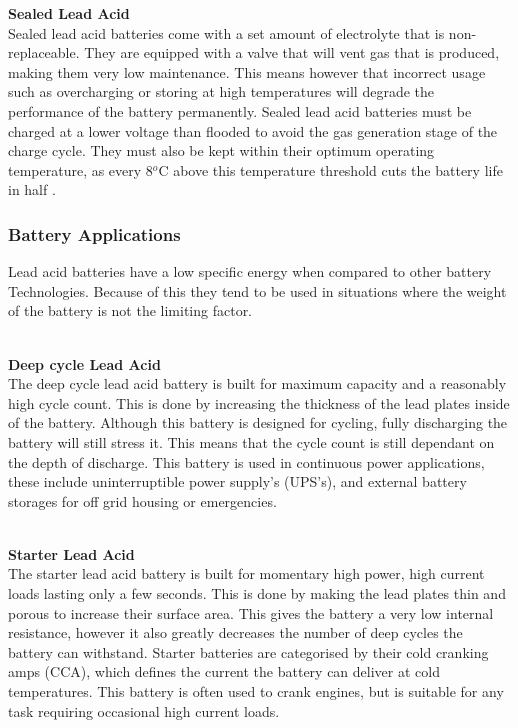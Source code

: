 \documentclass[a4paper,11pt, twocolumn]{article}
\begin{document}
\textbf{Sealed Lead Acid}\\
Sealed lead acid batteries come with a set amount of electrolyte that is non-replaceable. They are equipped with a valve that will vent gas that is produced, making them very low maintenance. This means however that incorrect usage such as overcharging or storing at high temperatures will degrade the performance of the battery permanently. Sealed lead acid batteries must be charged at a lower voltage than flooded to avoid the gas generation stage of the charge cycle. They must also be kept within their optimum operating temperature, as every 8$^o$C above this temperature threshold cuts the battery life in half \cite{lead_acid}.

\subsubsection{Battery Applications}

Lead acid batteries have a low specific energy when compared to other battery Technologies. Because of this they tend to be used in situations where the weight of the battery is not the limiting factor.

\textbf{\\Deep cycle Lead Acid}\\
The deep cycle lead acid battery is built for maximum capacity and a reasonably high cycle count. This is done by increasing the thickness of the lead plates inside of the battery. Although this battery is designed for cycling, fully discharging the battery will still stress it. This means that the cycle count is still dependant on the depth of discharge. This battery is used in continuous power applications, these include uninterruptible power supply’s (UPS’s), and external battery storages for off grid housing or emergencies.

\textbf{\\Starter Lead Acid}\\
The starter lead acid battery is built for momentary high power, high current loads lasting only a few seconds. This is done by making the lead plates thin and porous to increase their surface area. This gives the battery a very low internal resistance, however it also greatly decreases the number of deep cycles the battery can withstand. Starter batteries are categorised by their cold cranking amps (CCA), which defines the current the battery can deliver at cold temperatures. This battery is often used to crank engines, but is suitable for any task requiring occasional high current loads.
\end{document}
